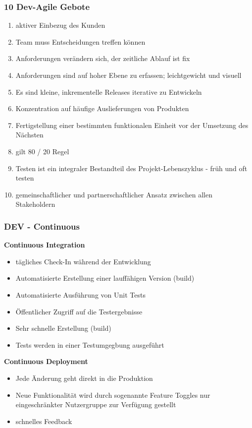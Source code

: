 \documentclass{report}
\theoremstyle{definition}
\theoremstyle{example}
\begin{document}
\subsubsection{10 Dev-Agile Gebote}
\begin{enumerate}
	\item aktiver Einbezug des Kunden
	\item Team muss Entscheidungen treffen können
	\item Anforderungen verändern sich, der zeitliche Ablauf ist fix
	\item Anforderungen sind auf hoher Ebene zu erfassen; leichtgewicht und visuell
	\item Es sind kleine, inkrementelle Releases iterative zu Entwickeln
	\item Konzentration auf häufige Auslieferungen von Produkten
	\item Fertigstellung einer bestimmten funktionalen Einheit vor der Umsetzung des Nächsten
	\item gilt 80 / 20 Regel
	\item Testen ist ein integraler Bestandteil des Projekt-Lebenszyklus - früh und oft testen
	\item gemeinschaftlicher und partnerschaftlicher Ansatz zwischen allen Stakeholdern
\end{enumerate}

\subsubsection{DEV - Continuous}
\textbf{Continuous Integration}
\begin{itemize}
	\item tägliches Check-In während der Entwicklung
	\item Automatisierte Erstellung einer lauffähigen Version (build)
	\item Automatisierte Ausführung von Unit Tests
	\item Öffentlicher Zugriff auf die Testergebnisse
	\item Sehr schnelle Erstellung (build)
	\item Tests werden in einer Testumgegbung ausgeführt
\end{itemize}

\textbf{Continuous Deployment}
\begin{itemize}
	\item Jede Änderung geht direkt in die Produktion
	\item Neue Funktionalität wird durch sogenannte Feature Toggles nur eingeschränkter Nutzergruppe zur Verfügung gestellt
	\item schnelles Feedback
\end{itemize}
\end{document}
